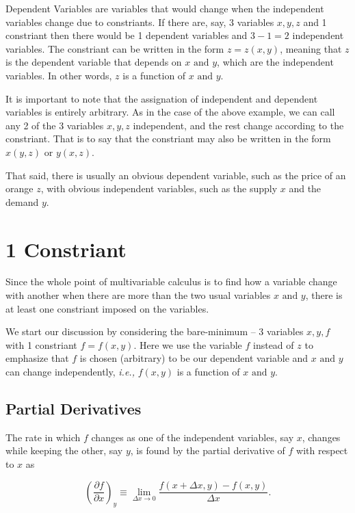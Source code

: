 \documentclass[english,a4paper,12pt]{report}
\begin{document}
Dependent Variables are variables that would change when the independent variables change due to constriants. If there are, say, 3 variables \(x,y,z\) and 1 constriant then there would be 1 dependent variables and \(3-1=2\) independent variables. The constriant can be written in the form \(z = z(x,y)\), meaning that \(z\) is the dependent variable that depends on \(x \text { and } y\), which are the independent variables. In other words, \(z\) is a function of \(x \text { and } y\).   

It is important to note that the assignation of independent and dependent variables is entirely arbitrary. As in the case of the above example, we can call any 2 of the 3 variables \(x,y,z\) independent, and the rest change according to the constriant. That is to say that the constriant may also be written in the form \(x(y,z) \text { or } y(x,z)\). 

That said, there is usually an obvious dependent variable, such as the price of an orange \(z\), with obvious independent variables, such as the supply \(x\) and the demand \(y\).  

\section{1 Constriant}

Since the whole point of multivariable calculus is to find how a variable change with another when there are more than the two usual variables \(x \text { and } y\), there is at least one constriant imposed on the variables. 

We start our discussion by considering the bare-minimum -- 3 variables \(x,y,f\) with 1 constriant \(f = f(x,y)\). Here we use the variable \(f\) instead of \(z\) to emphasize that \(f\) is chosen (arbitrary) to be our dependent variable and \(x \text { and } y\) can change independently, \textit{i.e.,} \(f(x,y)\) is a function of \(x \text { and } y\).  

\subsection{Partial Derivatives}

The rate in which \(f\) changes as one of the independent variables, say \(x\), changes while keeping the other, say \(y\), is found by the partial derivative of \(f\) with respect to \(x\) as

\begin{equation}
	\left( \frac{\partial f}{\partial x} \right)_{y} \equiv  \lim_{\Delta x \to 0} \frac{f(x+\Delta x,y) - f(x,y)}{\Delta x}.  
\end{equation}
\end{document}
